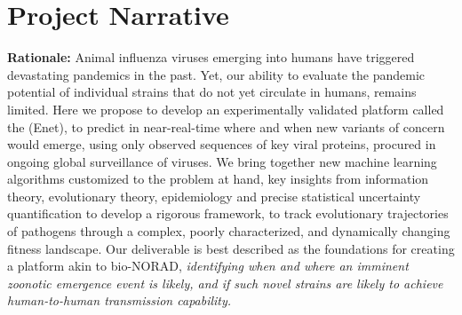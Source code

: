 \documentclass[onecolumn, compsoc,12pt]{IEEEtran}
\begin{document}
 


\section*{Project Narrative}

\textbf{Rationale:}
Animal influenza  viruses emerging into humans %
have triggered devastating  pandemics in the past. Yet, our ability to evaluate the pandemic potential of individual strains that do not yet circulate in humans, remains limited. Here we propose to develop an experimentally  validated platform called the \enet (Enet), to predict in near-real-time where and when  new variants of concern would emerge,  using only observed  sequences  of key viral proteins, procured in ongoing global surveillance of \infl viruses. We bring together new machine learning algorithms customized to the problem at hand, key insights from information theory, evolutionary theory, epidemiology and precise statistical  uncertainty quantification to develop a rigorous framework, to  track evolutionary trajectories of pathogens through a complex, poorly characterized, and dynamically changing fitness landscape. Our deliverable is best described as the foundations for creating a platform akin to bio-NORAD,  \textit{identifying when and where an imminent zoonotic emergence event is likely, and if such novel strains are likely to achieve human-to-human transmission capability.}
\end{document}
